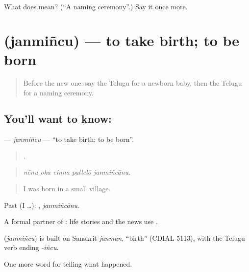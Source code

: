 \begin{tcolorbox}[breakable,colback=teal!4,colframe=teal!35!black,title={Before you move on}]
What does  mean? (\textquotedblleft{}A naming ceremony\textquotedblright{}.) Say it once more.
\end{tcolorbox}
\section[\texorpdfstring{\te{జన్మించు} (janmiñcu)}{జన్మించు (janmiñcu)}]{ (janmiñcu) — to take birth; to be born}

\label{lesson:TE-C334-janmincu}



\begin{quote}
Before the new one: say the Telugu for a newborn baby, then the Telugu for a naming ceremony.
\end{quote}

\subsection*{You'll want to know: }
\textbf{} — \emph{janmiñcu} — \textquotedblleft{}to take birth; to be born\textquotedblright{}.

\begin{quote}
    .
\end{quote}

\begin{quote}
\emph{nēnu oka cinna pallelō janmiñcānu.}
\end{quote}

\begin{quote}
I was born in a small village.
\end{quote}

Past (I …): , \emph{janmiñcānu}.

A formal partner of : life stories and the news use .

\begin{cousinweb}
\textbf{} (\emph{janmiñcu}) is built on Sanskrit \emph{janman}, \textquotedblleft{}birth\textquotedblright{} (CDIAL 5113), with the Telugu verb ending \emph{-iñcu}.
\end{cousinweb}

\begin{grammarlens}[title={What you've built}]
One more word for telling what happened.
\end{grammarlens}

